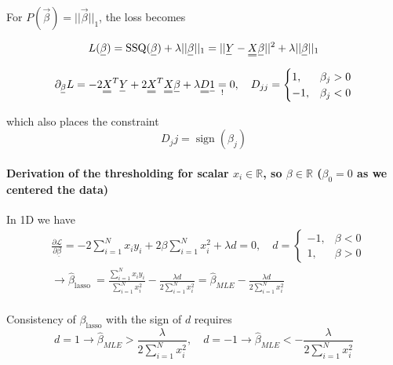 For $P(\vec{\beta}) = || \vec{\beta} ||_1$, the loss becomes

\begin{equation}
    L(\vec{\beta}) = \operatorname{SSQ}(\vec{\beta}) + \lambda || \vec{\beta} ||_1 = || \vec{Y} - \mat{X} \vec{\beta} ||^2 + \lambda || \vec{\beta} ||_1
\end{equation}


\begin{equation}
    \partial_\vec{\beta} L = -2 \mat{X}^T \vec{Y} + 2 \mat{X}^T \mat{X} \vec{\beta} + \lambda \mat{D} \vec{1} \underset{!}{=} 0, \quad D_{jj} = \begin{cases} 1, & \beta_j > 0 \\ -1, & \beta_j < 0 \end{cases}
\end{equation}

which also places the constraint
\begin{equation}
    D_jj = \operatorname{sign}(\beta_j)
\end{equation}

\paragraph{Derivation of the thresholding for scalar $x_i \in \mathbb{R}$, so $\beta \in \mathbb{R}$ ($\beta_0 = 0$ as we centered the data)} In 1D
we have
\begin{equation}
    \begin{aligned}
    & \frac{\partial \mathcal{L}}{\partial \underline{\beta}}=-2 \sum_{i=1}^N x_i y_i+2 \beta \sum_{i=1}^N x_i^2+\lambda d=0, \quad d=\left\{\begin{array}{cc}
    -1, & \beta<0 \\
    1, & \beta>0
    \end{array}\right. \\
    & \rightarrow \hat{\beta}_{\text {lasso }}=\frac{\sum_{i=1}^N x_i y_i}{\sum_{i=1}^N x_i^2}-\frac{\lambda d}{2 \sum_{i=1}^N x_i^2}=\hat{\beta}_{M L E}-\frac{\lambda d}{2 \sum_{i=1}^N x_i^2} \\
    &
    \end{aligned}
\end{equation}

Consistency of $\beta_{\text{lasso}}$ with the sign of $d$ requires
\begin{equation}
    d=1 \rightarrow \hat{\beta}_{M L E}>\frac{\lambda}{2 \sum_{i=1}^N x_i^2}, \quad d=-1 \rightarrow \hat{\beta}_{M L E}<-\frac{\lambda}{2 \sum_{i=1}^N x_i^2}
\end{equation}

